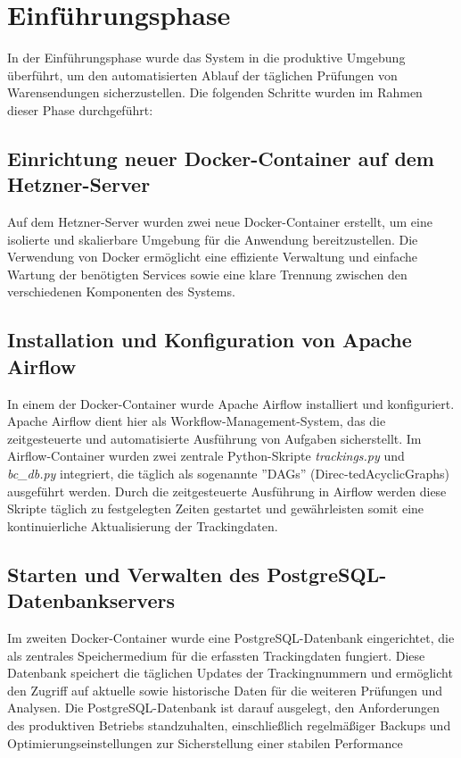 \section{Einführungsphase}
\label{sec:Einfuehrungsphase}
In der Einführungsphase wurde das System in die produktive Umgebung überführt, 
um den automatisierten Ablauf der täglichen Prüfungen von Warensendungen sicherzustellen. 
Die folgenden Schritte wurden im Rahmen dieser Phase durchgeführt:

\subsection{Einrichtung neuer Docker-Container auf dem Hetzner-Server}
\label{sec:Docker}
Auf dem Hetzner-Server wurden zwei neue Docker-Container erstellt, um eine isolierte und skalierbare 
Umgebung für die Anwendung bereitzustellen. Die Verwendung von Docker ermöglicht eine effiziente 
Verwaltung und einfache Wartung der benötigten Services sowie eine klare Trennung zwischen den verschiedenen 
Komponenten des Systems.

\subsection{Installation und Konfiguration von Apache Airflow}
\label{sec:ApacheAirflow}
In einem der Docker-Container wurde Apache Airflow installiert und konfiguriert. Apache Airflow dient hier als 
Workflow-Management-System, das die zeitgesteuerte und automatisierte Ausführung von Aufgaben sicherstellt. 
Im Airflow-Container wurden zwei zentrale Python-Skripte \textit{trackings.py} und \textit{bc\_db.py} integriert, die täglich als 
sogenannte ”DAGs” (Direc-tedAcyclicGraphs) ausgeführt werden.
Durch die zeitgesteuerte Ausführung in Airflow werden diese Skripte täglich zu festgelegten Zeiten gestartet und 
gewährleisten somit eine kontinuierliche Aktualisierung der Trackingdaten.


\subsection{Starten und Verwalten des PostgreSQL-Datenbankservers}
\label{sec:PostgreSQLDB}
Im zweiten Docker-Container wurde eine PostgreSQL-Datenbank eingerichtet, die als zentrales Speichermedium für die 
erfassten Trackingdaten fungiert. Diese Datenbank speichert die täglichen Updates der Trackingnummern und ermöglicht 
den Zugriff auf aktuelle sowie historische Daten für die weiteren Prüfungen und Analysen. Die PostgreSQL-Datenbank 
ist darauf ausgelegt, den Anforderungen des produktiven Betriebs standzuhalten, einschließlich regelmäßiger Backups 
und Optimierungseinstellungen zur Sicherstellung einer stabilen Performance

